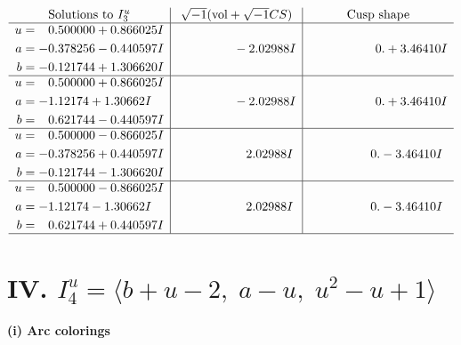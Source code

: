 \documentclass[1p]{elsarticle_modified}
\theoremstyle{definition}
\newcommand{\I}{\sqrt{-1}}
\begin{document}
$$\begin{array}{c|c|c}  
\text{Solutions to }I^u_{3}& \I (\text{vol} + \sqrt{-1}CS) & \text{Cusp shape}\\
 \hline 
\begin{aligned}
u &= \phantom{-}0.500000 + 0.866025 I \\
a &= -0.378256 - 0.440597 I \\
b &= -0.121744 + 1.306620 I\end{aligned}
 & \phantom{-0.000000 } -2.02988 I & \phantom{-0.000000 -}0. + 3.46410 I \\ \hline\begin{aligned}
u &= \phantom{-}0.500000 + 0.866025 I \\
a &= -1.12174 + 1.30662 I \\
b &= \phantom{-}0.621744 - 0.440597 I\end{aligned}
 & \phantom{-0.000000 } -2.02988 I & \phantom{-0.000000 -}0. + 3.46410 I \\ \hline\begin{aligned}
u &= \phantom{-}0.500000 - 0.866025 I \\
a &= -0.378256 + 0.440597 I \\
b &= -0.121744 - 1.306620 I\end{aligned}
 & \phantom{-0.000000 -}2.02988 I & \phantom{-0.000000 } 0. - 3.46410 I \\ \hline\begin{aligned}
u &= \phantom{-}0.500000 - 0.866025 I \\
a &= -1.12174 - 1.30662 I \\
b &= \phantom{-}0.621744 + 0.440597 I\end{aligned}
 & \phantom{-0.000000 -}2.02988 I & \phantom{-0.000000 } 0. - 3.46410 I\\
 \hline 
 \end{array}$$\newpage\newpage\renewcommand{\arraystretch}{1}
\centering \section*{IV. $I^u_{4}= \langle b+u-2,\;a- u,\;u^2- u+1 \rangle$}
\flushleft \textbf{(i) Arc colorings}\\
\end{document}
